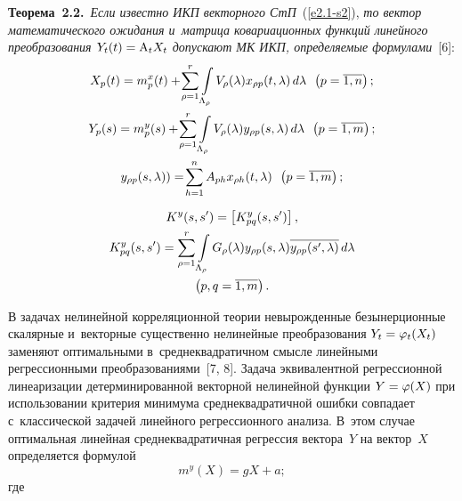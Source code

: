 \begin{multicols}{2}
\smallskip

\noindent
\textbf{Теорема~2.2.}\ \textit{Если известно ИКП векторного СтП}~(\ref{e2.1-s2}), \textit{то вектор математического ожидания 
и~матрица ковариационных функций линейного преобразования $Y_t (t) \hm= \mathrm{A}_t 
X_t$ допускают МК ИКП, определяемые формулами}~[6]:
    \begin{gather*}
     X_p(t) = m_p^x(t) + \!\sum\limits_{\rho=1}^r \int\limits_{\Lambda_\rho} V_\rho (\lambda) 
x_{\rho p}(t,\lambda) \,d\lambda\enskip \left(p=\overline{1,n}\right);
\\
     Y_p(s) = m_p^y(s) + \!\sum\limits_{\rho=1}^r \int\limits_{\Lambda_\rho} V_\rho (\lambda) 
y_{\rho p}(s,\lambda) \,d\lambda\enskip \left(p=\overline{1,m}\right);
\\
     y_{\rho p}(s,\lambda)) = \!\sum\limits_{h=1}^n  A_{ph} x_{\rho h} (t,\lambda)\enskip 
\left(p=\overline{1,m}\right);
\end{gather*}

\vspace*{-12pt}

\noindent
    \begin{multline*}
     K^y (s,s') =\left[ K_{pq}^y (s,s')\right],\\
     K_{pq}^y (s,s') = \displaystyle \sum\limits_{\rho=1}^r \int\limits_{\Lambda_\rho} G_\rho (\lambda) 
y_{\rho p}(s,\lambda) \overline{y_{\rho p}(s',\lambda)}\,d\lambda\\
\left(p,q=\overline{1,m}\right).
      \end{multline*}

В задачах нелинейной корреляционной теории невырожденные безынерционные 
скалярные и~векторные существенно нелинейные преобразования $Y_t \hm=\varphi_t(X_t)$ 
заменяют оптимальными в~среднеквадратичном смысле линейными регрессионными 
преобразованиями~[7, 8]. Задача эквивалентной регрессионной линеаризации 
детерминированной векторной нелинейной функции $Y\hm=\varphi (X)$ при использовании 
критерия минимума среднеквадратичной ошибки совпадает с~классической задачей 
линейного регрессионного анализа. В~этом случае оптимальная линейная 
среднеквадратичная регрессия вектора~$Y$ на вектор~$X$ определяется формулой
        \begin{equation*}
     m^y(X) =gX+a;
     \end{equation*}
     где
     
     \vspace*{-3pt}
     

\end{multicols}
